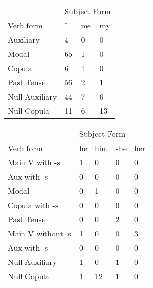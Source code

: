 \begin{table}[]
\begin{minipage}{0.5\textwidth}
    \centering
    \begin{tabular}{@{}llll@{}}
        \toprule
            &\multicolumn{3}{l}{Subject Form}\\
            \cline{2-4}
        Verb form & I & me & my \\
        \midrule
        Auxiliary & 4 & 0 & 0 \\
        Modal & 65 & 1 & 0 \\
        Copula & 6 & 1 & 0 \\
        Past Tense & 56 & 2 & 1 \\
        \hline
        Null Auxiliary & 44 & 7 & 6 \\
        Null Copula & 11 & 6 & 13 \\
        \bottomrule
    \end{tabular}
\end{minipage}
\begin{minipage}{0.5\textwidth}
    \centering
    \begin{tabular}{@{}lllll@{}}
        \toprule
            &\multicolumn{4}{l}{Subject Form}\\
            \cline{2-5}
        Verb form & he & him & she & her \\
        \midrule
        Main V with -s & 1 & 0 & 0 & 0 \\
        Aux with -s & 0 & 0 & 0 & 0 \\
        Modal & 0 & 1 & 0 & 0 \\
        Copula with -s & 0 & 0 & 0 & 0 \\
        Past Tense & 0 & 0 & 2 & 0 \\
        \hline
        Main V without -s & 1 & 0 & 0 & 3 \\
        Aux with -s & 0 & 0 & 0 & 0 \\
        Null Auxiliary & 1 & 0 & 1 & 0 \\
        Null Copula & 1 & 12 & 1 & 0 \\
        \bottomrule
    \end{tabular}
    \end{minipage}
\end{table}
